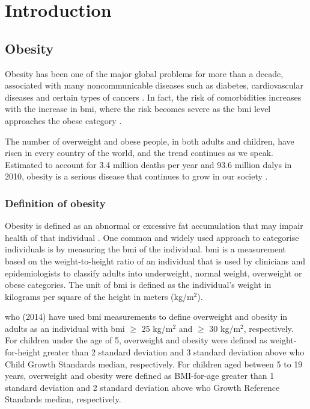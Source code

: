 \chapter{Introduction}
\label{ch:intro}

\section{Obesity}
\label{sec:obesity}

Obesity has been one of the major global problems for more than a decade, associated with many noncommunicable diseases such as diabetes, cardiovascular diseases and certain types of cancers \citep{WHO2014}.
In fact, the risk of comorbidities increases with the increase in \gls{bmi}, where the risk becomes severe as the \gls{bmi} level approaches the obese category \citep{WHO2000}.

The number of overweight and obese people, in both adults and children, have risen in every country of the world, and the trend continues as we speak.
Estimated to account for 3.4 million deaths per year and 93.6 million \glspl{daly} in 2010, obesity is a serious disease that continues to grow in our society \citep{Lim2012}.

\subsection{Definition of obesity}
\label{sub:definition_of_obesity}

Obesity is defined as an abnormal or excessive fat accumulation that may impair health of that individual \citep{Garrow1988}.
One common and widely used approach to categorise individuals is by measuring the \gls{bmi} of the individual.
\gls{bmi} is a measurement based on the weight-to-height ratio of an individual that is used by clinicians and epidemiologists to classify adults into underweight, normal weight, overweight or obese categories.
The unit of \gls{bmi} is defined as the individual's weight in kilograms per square of the height in meters (kg/m$^2$).

\gls{who} (2014) have used \gls{bmi} measurements to define overweight and obesity in adults as an individual with \gls{bmi} $\geq$ 25 kg/m$^2$ and $\geq$ 30 kg/m$^2$, respectively.
For children under the age of 5, overweight and obesity were defined as weight-for-height greater than 2 standard deviation and 3 standard deviation above \gls{who} Child Growth Standards median, respectively.
For children aged between 5 to 19 years, overweight and obesity were defined as BMI-for-age greater than 1 standard deviation and 2 standard deviation above \gls{who} Growth Reference Standards median, respectively.


